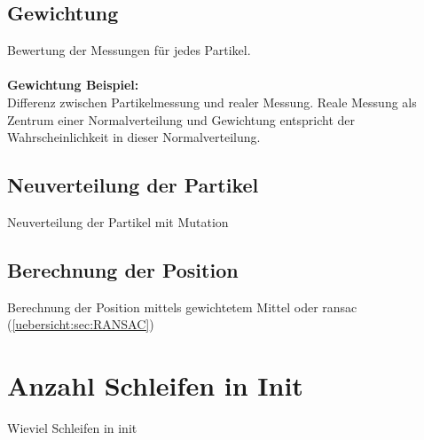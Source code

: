		\subsection{Gewichtung}
		Bewertung der Messungen für jedes Partikel. \\
		\\
		\textbf{Gewichtung Beispiel:} \\
		Differenz zwischen Partikelmessung und realer Messung. Reale Messung als Zentrum einer Normalverteilung und Gewichtung entspricht der Wahrscheinlichkeit in dieser Normalverteilung.
		
		\subsection{Neuverteilung der Partikel}
		Neuverteilung der Partikel mit Mutation
		
		\subsection{Berechnung der Position}	
		Berechnung der Position mittels gewichtetem Mittel oder ransac \cite{ransac} (\ref{uebersicht:sec:RANSAC})

	
	\section{Anzahl Schleifen in Init}
	Wieviel Schleifen in init

